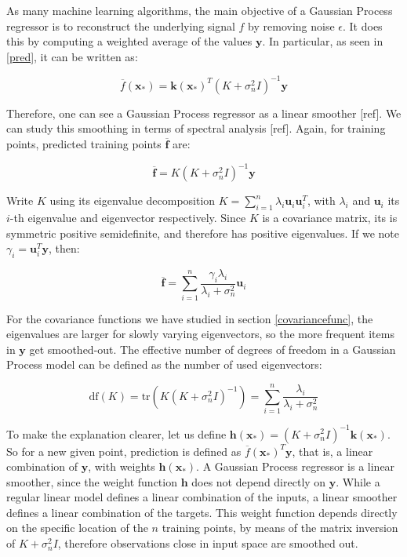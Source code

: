 \documentclass[10pt,a4paper,twoside]{book}
\begin{document}
As many machine learning algorithms, the main objective of a Gaussian Process regressor is to reconstruct the underlying signal $f$ by removing noise $\epsilon$. It does this by computing a weighted average of the values $\boldsymbol{y}$. In particular, as seen in \ref{pred}, it can be written as:

\begin{equation}
\overline{f}(\boldsymbol{x}_*) = \boldsymbol{k}(\boldsymbol{x}_*)^T(K + \sigma_n^2 I)^{-1}\boldsymbol{y}
\end{equation}

Therefore, one can see a Gaussian Process regressor as a linear smoother [ref]. We can study this smoothing in terms of spectral analysis [ref]. Again, for training points, predicted training points $\overline{\boldsymbol{f}}$ are:

\begin{equation}
\overline{\boldsymbol{f}} = K(K + \sigma_n^2 I)^{-1}\boldsymbol{y}
\end{equation}

Write $K$ using its eigenvalue decomposition $K = \sum_{i=1}^n \lambda_i \boldsymbol{u}_i\boldsymbol{u}_i^T$, with $\lambda_i$ and $\boldsymbol{u}_i$ its $i$-th eigenvalue and eigenvector respectively. Since $K$ is a covariance matrix, its is symmetric positive semidefinite, and therefore has positive eigenvalues. If we note $\gamma_i = \boldsymbol{u}_i^T\boldsymbol{y}$, then:

\begin{equation}
\overline{\boldsymbol{f}} = \sum_{i=1}^n \dfrac{\gamma_i \lambda_i}{\lambda_i + \sigma^2_n}\boldsymbol{u}_i
\end{equation}

For the covariance functions we have studied in section \ref{covariancefunc}, the eigenvalues are larger for slowly varying eigenvectors, so the more frequent items in $\boldsymbol{y}$ get smoothed-out. The effective number of degrees of freedom in a Gaussian Process model can be defined as the number of used eigenvectors:

\begin{equation}
\mathrm{df}(K) = \mathrm{tr}(K(K + \sigma_n^2 I)^{-1}) = \sum_{i=1}^n\dfrac{\lambda_i}{\lambda_i + \sigma_n^2}
\end{equation}

To make the explanation clearer, let us define $\boldsymbol{h}(\boldsymbol{x}_*) = (K + \sigma_n^2 I)^{-1}\boldsymbol{k}(\boldsymbol{x}_*)$. So for a new given point, prediction is defined as $\overline{f}(\boldsymbol{x}_*)^T \boldsymbol{y}$, that is, a linear combination of $\boldsymbol{y}$, with weights $\boldsymbol{h}(\boldsymbol{x}_*)$. A Gaussian Process regressor is a linear smoother, since the weight function $\boldsymbol{h}$ does not depend directly on $\boldsymbol{y}$. While a regular linear model defines a linear combination of the inputs, a linear smoother defines a linear combination of the targets. This weight function depends directly on the specific location of the $n$ training points, by means of the matrix inversion of $K + \sigma_n^2 I$, therefore observations close in input space are smoothed out.
\end{document}
